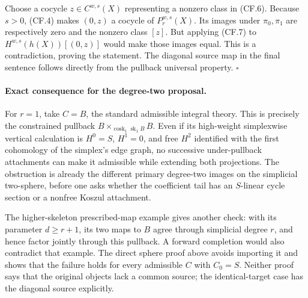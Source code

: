 Choose a cocycle \(z\in C^{w,s}(X)\) representing a nonzero
class in (CF.6). Because \(s>0\), (CF.4) makes
\((0,z)\) a cocycle of \(P_r^{w,s}(X)\). Its images under
\(\pi_0,\pi_1\) are respectively zero and the nonzero class
\([z]\). But applying (CF.7) to \(H^{w,s}(h(X))[(0,z)]\)
would make those images equal. This is a contradiction, proving
the statement. The diagonal source map in the final sentence
follows directly from the pullback universal property.
\(\square\)

\paragraph{Exact consequence for the degree-two proposal.}
For \(r=1\), take \(C=B\), the standard admissible integral
theory. This is precisely the constrained pullback
\(B\times_{\operatorname{cosk}_1\operatorname{sk}_1 B}B\).
Even if its high-weight simplexwise vertical calculation is
\(H^0=S\), \(H^1=0\), and free \(H^2\) identified with the
first cohomology of the simplex's edge graph, no successive
under-pullback attachments can make it admissible while extending
both projections. The obstruction is already the different
primary degree-two images on the simplicial two-sphere, before
one asks whether the coefficient tail has an \(S\)-linear cycle
section or a nonfree Koszul attachment.

The higher-skeleton prescribed-map example gives another check:
with its parameter \(d\geq r+1\), its two maps to \(B\) agree
through simplicial degree \(r\), and hence factor jointly through
this pullback. A forward completion would also contradict that
example. The direct sphere proof above avoids importing it and
shows that the failure holds for every admissible \(C\) with
\(C_0=S\). Neither proof says that the original objects lack a
common source; the identical-target case has the diagonal source
explicitly.
